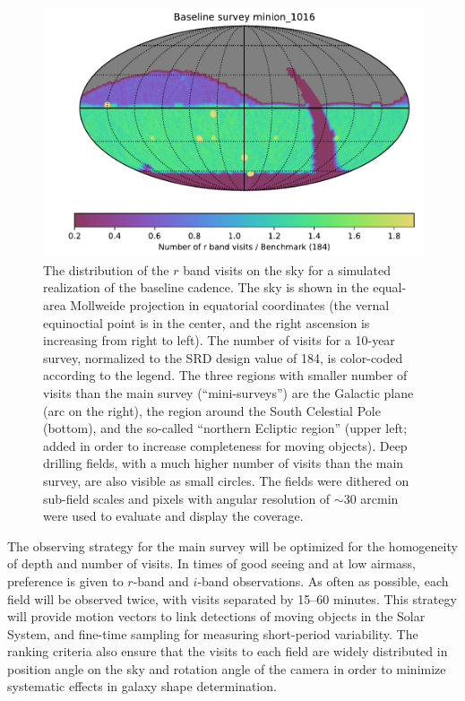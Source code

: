 \begin{figure}
\includegraphics[width=1.0\hsize,clip]{nvisit_minion1016}
\caption{The distribution of the $r$ band visits on the sky for a simulated
realization of the baseline cadence. The sky is shown in the equal-area Mollweide
projection in equatorial coordinates (the vernal equinoctial point is in the center, and
the right ascension is increasing from right to left). The number of visits for
a 10-year survey, normalized to the SRD design value of 184, is color-coded according
to the legend. The three regions with smaller number of visits than the main survey
(``mini-surveys'') are the Galactic plane (arc on the right), the region around the
South Celestial Pole (bottom), and the so-called ``northern Ecliptic region'' (upper left;
added in order to increase completeness for moving objects). Deep drilling fields, with
a much higher number of visits than the main survey, are also visible as small circles.
The fields were dithered on sub-field scales and pixels with angular resolution of
$\sim$30 arcmin were used to evaluate and display the coverage.}
\label{Fig:rbandSky}
\end{figure}

The observing strategy for the main survey will be optimized for the homogeneity
of depth and number of visits. In times of good seeing and at low airmass, preference
is given to $r$-band and $i$-band observations. As often as possible, each field will be
observed twice, with visits separated by 15--60 minutes. This strategy will provide motion
vectors to link detections of moving objects in the Solar System, and fine-time sampling
for measuring short-period variability. The ranking criteria also ensure that the
visits to each field are widely distributed in position angle on the sky and
rotation angle of the camera in order to minimize systematic effects in galaxy shape
determination.

